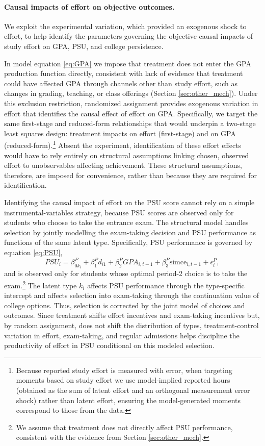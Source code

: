 \paragraph{Causal impacts of effort on objective outcomes.} 
We exploit the experimental variation, which provided an exogenous shock to effort, to help identify the parameters governing the objective causal impacts of study effort on GPA, PSU, and college persistence. \par

In model equation \eqref{eq:GPA} we impose that treatment does not enter the GPA production function directly, consistent with lack of evidence that treatment could have affected GPA through channels other than study effort, such as changes in grading, teaching, or class offerings (Section \ref{sec:other_mech}). Under this exclusion restriction, randomized assignment provides exogenous variation in effort that identifies the causal effect of effort on GPA. Specifically, we target the same first-stage and reduced-form relationships that would underpin a two-stage least squares design: treatment impacts on effort (first-stage) and on GPA (reduced-form).\footnote{Because reported study effort is measured with error, when targeting moments based on study effort we use model-implied reported hours (obtained as the sum of latent effort and an orthogonal measurement error shock) rather than latent effort, ensuring the model-generated moments correspond to those from the data.} Absent the experiment, identification of these effort effects would have to rely entirely on structural assumptions linking chosen, observed effort to unobservables affecting achievement. These structural assumptions, therefore, are imposed for convenience, rather than because they are required for identification.\par

Identifying the causal impact of effort on the PSU score cannot rely on a simple instrumental-variables strategy, because PSU scores are observed only for students who choose to take the entrance exam. The structural model handles selection by jointly modelling the exam-taking decision and PSU performance as functions of the same latent type. Specifically, PSU performance is governed by equation \eqref{eq:PSU},
\[
PSU_i=\beta^P_{0k_i}+\beta^P_1 d_{i1}+\beta^P_2 GPA_{i,t-1}+\beta^P_3 \mbox{simce}_{i,t-1}+\epsilon_i^P,
\]
and is observed only for students whose optimal period-2 choice is to take the exam.\footnote{We assume that treatment does not directly affect PSU performance, consistent with the evidence from Section \ref{sec:other_mech}.} The latent type $k_i$ affects PSU performance through the type-specific intercept and affects selection into exam-taking through the continuation value of college options. Thus, selection is corrected by the joint model of choices and outcomes. Since treatment shifts effort incentives and exam-taking incentives but, by random assignment, does not shift the distribution of types, treatment-control variation in effort, exam-taking, and regular admissions helps discipline the productivity of effort in PSU conditional on this modeled selection.\par


